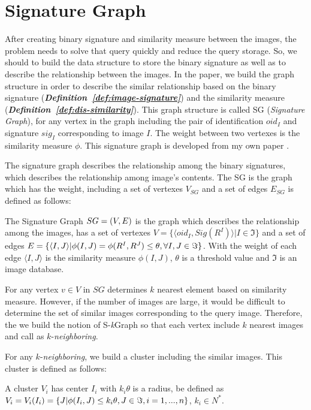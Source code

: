 \documentclass{amcs}
\begin{document}
\section{Signature Graph}
\label{Signature Graph}
After creating binary signature and similarity measure between the images, the problem needs to solve that query quickly and reduce the query storage. So, we should to build the data structure to store the binary signature as well as to describe the relationship between the images. In the paper, we build the graph structure in order to describe the similar relationship based on the binary signature (\textit{\textbf{Definition~\ref{def:image-signature}}}) and the similarity measure (\textit{\textbf{Definition~\ref{def:dis-similarity}}}). This graph structure is called SG (\textit{Signature Graph}), for any vertex in the graph including the pair of identification $oi{d_I}$ and signature $si{g_I}$ corresponding to image $I$. The weight between two vertexes is the similarity measure $\phi $. This signature graph is developed from my own paper \cite{Thanh:2014b}.

The signature graph describes the relationship among the binary signatures, which describes the relationship among image's contents. The SG is the graph which has the weight, including a set of vertexes ${V_{SG}}$ and a set of edges ${E_{SG}}$ is defined as follows:
\begin{definition}{} The Signature Graph $SG = \left( {V,{\rm{ }}E} \right)$ is the graph which describes the relationship among the images, has a set of vertexes $V = \{ \langle oi{d_I},Sig({R^I})\rangle |I \in \Im \} $ and a set of edges $E = \{ \langle I,J\rangle |\phi (I,J) = \phi ({R^I},{R^J}) \le \theta ,{\rm{ }}\forall I,J \in \Im \} $. With the weight of each edge $\langle I,J\rangle $ is the similarity measure $\phi (I,J)$, $\theta $ is a threshold value and $\Im $ is an image database. 
\end{definition}

For any vertex $v \in V$ in $SG$ determines $k$ nearest element based on similarity measure. However, if the number of images are large, it would be difficult to determine the set of similar images corresponding to the query image. Therefore, the we build the notion of S-\textit{k}Graph so that each vertex include $k$ nearest images and call as $k$-\textit{neighboring}.

For any $k$-\textit{neighboring}, we build a cluster including the similar images. This cluster is defined as follows: 
\begin{definition}{} A cluster ${V_i}$ has center ${I_i}$ with ${k_i}\theta $ is a radius, be defined as ${V_i} = {V_i}({I_i}) = \{ J|\phi ({I_i},J) \le {k_i}\theta ,J \in \Im ,{\rm{ }}i = 1,...,n\} $, ${k_i} \in {N^*}$.
\end{definition}
\end{document}
